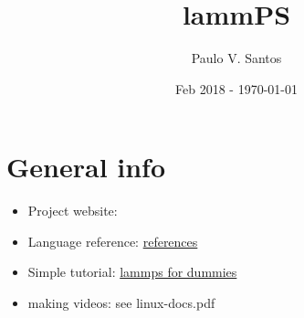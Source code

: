 \documentclass[10pt]{book} %
\def\litdir{x:/sawoptik_databases/jabref}
\def\rootdir{.}
\begin{document}
\selectfont


\title{lammPS}
\author{Paulo V. Santos}
\date{Feb 2018 - \today}

\maketitle



{\let\newpage\relax\tableofcontents}


%




\section{General info}

\begin{itemize}
\item Project website: 
\item Language reference: \href{http://lammps.sandia.gov/doc}{references}
\item Simple tutorial: \href{http://wp.df.uba.ar/gebi/wp-content/uploads/sites/9/2016/06/lammps.pdf}{lammps for dummies}
\item making videos: see linux-docs.pdf
\end{itemize}




%
\end{document}

